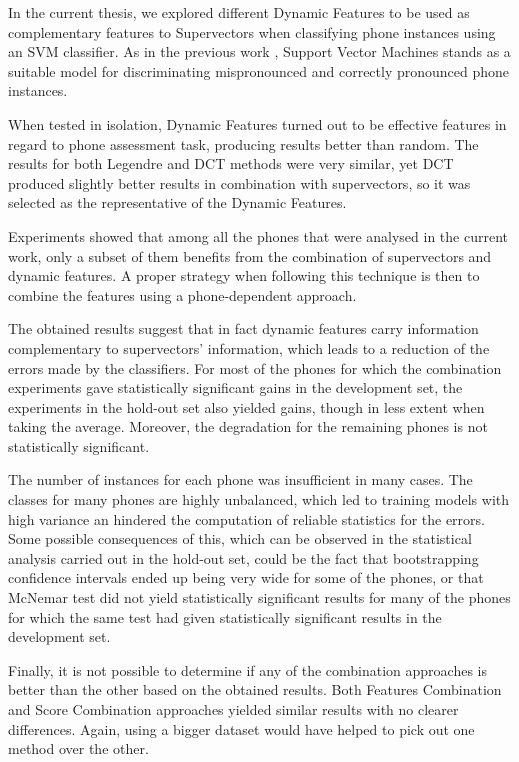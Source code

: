 In the current thesis, we explored different Dynamic Features to be used as complementary features to
Supervectors when classifying phone instances using an SVM classifier. As in the previous work \cite{main},
Support Vector Machines stands as a suitable model for discriminating mispronounced and correctly
pronounced phone instances.

When tested in isolation, Dynamic Features turned out to be effective features in regard to
phone assessment task, producing results better than random. The results for both
Legendre and DCT methods were very similar, yet DCT produced slightly better results in combination with
supervectors, so it was selected as the representative of the Dynamic Features.

Experiments showed that among all the phones that were analysed in the current work, only a subset of them
benefits from the combination of supervectors and dynamic features. A proper strategy when following this
technique is then to combine the features using a phone-dependent approach.

The obtained results suggest that in fact dynamic features carry
information complementary to supervectors' information, which leads to a reduction of the errors
made by the classifiers. For most of the phones for which the combination experiments gave statistically significant gains in the development set, the experiments in the hold-out set also yielded gains,
though in less extent when taking the average. Moreover, the degradation for the remaining phones
is not statistically significant.

The number of instances for each phone was insufficient in many cases. The classes for many
phones are highly unbalanced, which led to training models with high variance an
hindered the computation of reliable statistics for the errors.
Some possible consequences
of this, which can be observed in the statistical analysis carried out in the hold-out set,
could be the fact that bootstrapping
confidence intervals ended up being very wide for some of the phones,
or that McNemar test did not yield statistically significant results for many of the phones
for which the same test had given statistically significant results in the development set.

Finally, it is not possible to determine if any of the combination approaches is better than the other based
on the obtained results. Both Features Combination and Score Combination approaches yielded
similar results with no clearer differences. Again, using a bigger dataset would have helped to pick out one
method over the other.
